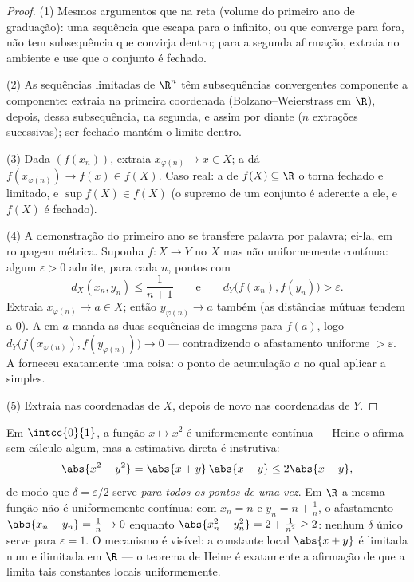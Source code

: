 \begin{proof}
(1) Mesmos argumentos que na reta (volume do primeiro ano de graduação): uma sequência que escapa para o%
infinito, ou que converge para fora, não tem subsequência
que convirja dentro; para a segunda afirmação, extraia no
 ambiente e use que o conjunto é fechado.

(2) As sequências limitadas de $\R^n$ têm subsequências convergentes
componente a componente: extraia na primeira coordenada
(Bolzano--Weierstrass em $\R$), depois, dessa subsequência, na
segunda, e assim por diante ($n$ extrações sucessivas); ser fechado mantém
o limite dentro.

(3) Dada $(f(x_n))$, extraia $x_{\varphi(n)} \to x \in X$;
a  dá $f(x_{\varphi(n)}) \to f(x) \in f(X)$. Caso real: a
 de $f(X) \subseteq \R$ o torna fechado e limitado, e
$\sup f(X) \in f(X)$ (o supremo de um conjunto é aderente a ele, e
$f(X)$ é fechado).

(4) A demonstração do primeiro ano se transfere palavra por palavra; ei-la, em roupagem
métrica. Suponha $f \colon X \to Y$  no  $X$
mas não uniformemente contínua: algum $\varepsilon > 0$ admite, para
cada $n$, pontos com
\[
d_X(x_n, y_n) \leq \frac{1}{n+1}
\qquad\text{e}\qquad
d_Y\bigl(f(x_n), f(y_n)\bigr) > \varepsilon .
\]
Extraia $x_{\varphi(n)} \to a \in X$; então $y_{\varphi(n)} \to
a$ também (as distâncias mútuas tendem a $0$). A  em $a$
manda as duas sequências de imagens para $f(a)$, logo
$d_Y\bigl(f(x_{\varphi(n)}), f(y_{\varphi(n)})\bigr) \to 0$ ---
contradizendo o afastamento uniforme $> \varepsilon$. A 
forneceu exatamente uma coisa: o ponto de acumulação $a$ no qual
aplicar a  simples.

(5) Extraia nas coordenadas de $X$, depois de novo nas
coordenadas de $Y$.
\end{proof}

\begin{example}\label{ex:b2:metric:heinework}
Em $\intcc{0}{1}$, a função $x \mapsto x^2$ é uniformemente
contínua --- Heine o afirma sem cálculo algum, mas a estimativa
direta é instrutiva:
\[
\abs{x^2 - y^2} = \abs{x + y}\,\abs{x - y} \leq 2\abs{x - y},
\]
de modo que $\delta = \varepsilon/2$ serve \emph{para todos os pontos de uma
vez}. Em $\R$ a mesma função não é uniformemente contínua:
com $x_n = n$ e $y_n = n + \frac1n$, o afastamento $\abs{x_n - y_n}
= \frac1n \to 0$ enquanto $\abs{x_n^2 - y_n^2} = 2 + \frac1{n^2}
\geq 2$: nenhum $\delta$ único serve para $\varepsilon = 1$. O
mecanismo é visível: a constante  local $\abs{x + y}$
é limitada num  e ilimitada em $\R$ --- o teorema de
Heine é exatamente a afirmação de que a  limita tais
constantes locais uniformemente.
\end{example}

